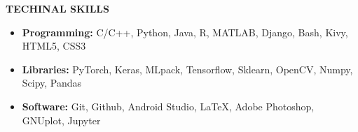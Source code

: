 \documentclass[11pt]{article}%
\begin{document}
\begin{flushleft}
\bf{\LARGE{T}\Large{ECHINAL} \LARGE{S}\Large{KILLS}}
\end{flushleft}
\vspace{-7mm}
\hrulefill
\vspace{-3mm}
\begin{itemize}
    \setlength\itemsep{0.01em}
    \item \textbf{Programming:} C/C++, Python, Java, R, MATLAB, Django, Bash, Kivy, HTML5, CSS3
    \vspace{-1.2mm}
    \item \textbf{Libraries:} PyTorch, Keras, MLpack, Tensorflow, Sklearn, OpenCV, Numpy, Scipy, Pandas
    \vspace{-1.2mm}
    \item \textbf{Software:}  Git, Github, Android Studio, \LaTeX, Adobe Photoshop, GNUplot, Jupyter
\end{itemize}

\vspace{-4mm}
\end{document}
